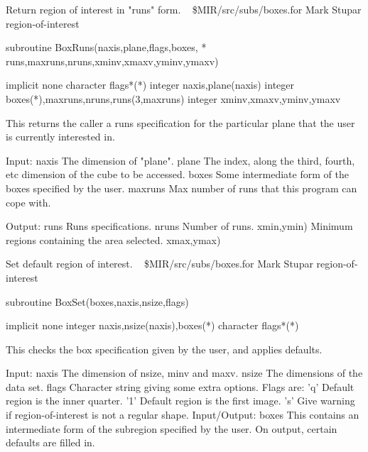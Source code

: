%
\noindent Return region of interest in "runs" form.
\newline \ 
\newline {} \$MIR/src/subs/boxes.for
\newline {} Mark Stupar
\newline {} region-of-interest
\par{\tenpoint
{\eightpoint\begintt
        subroutine BoxRuns(naxis,plane,flags,boxes,
     *                  runs,maxruns,nruns,xminv,xmaxv,yminv,ymaxv)

        implicit none
        character flags*(*)
        integer naxis,plane(naxis)
        integer boxes(*),maxruns,nruns,runs(3,maxruns)
        integer xminv,xmaxv,yminv,ymaxv

  This returns the caller a runs specification for the particular plane
  that the user is currently interested in.

  Input:
    naxis      The dimension of "plane".
    plane      The index, along the third, fourth, etc dimension of the
               cube to be accessed.
    boxes      Some intermediate form of the boxes specified by the user.
    maxruns    Max number of runs that this program can cope with.

  Output:
    runs       Runs specifications.
    nruns      Number of runs.
    xmin,ymin) Minimum regions containing the area selected.
    xmax,ymax)
\endtt}
\par}
%
\noindent Set default region of interest.
\newline \ 
\newline {} \$MIR/src/subs/boxes.for
\newline {} Mark Stupar
\newline \abox{Keywords:} region-of-interest
\par{\tenpoint
{\eightpoint\begintt
        subroutine BoxSet(boxes,naxis,nsize,flags)

        implicit none
        integer naxis,nsize(naxis),boxes(*)
        character flags*(*)

  This checks the box specification given by the user, and applies
  defaults.

  Input:
    naxis      The dimension of nsize, minv and maxv.
    nsize      The dimensions of the data set.
    flags      Character string giving some extra options. Flags are:
                 'q'   Default region is the inner quarter.
                 '1'   Default region is the first image.
                 's'   Give warning if region-of-interest is not a regular
                       shape.
  Input/Output:
    boxes      This contains an intermediate form of the subregion
               specified by the user. On output, certain defaults are
               filled in.
\endtt}
\par}
